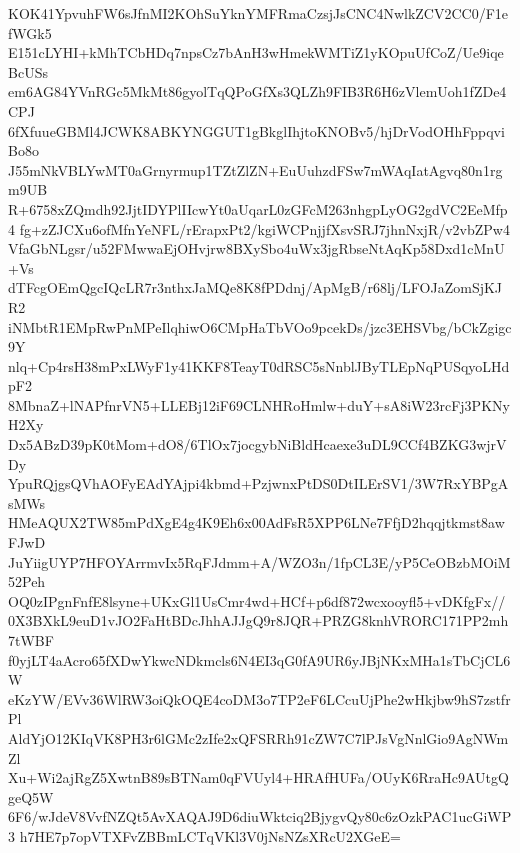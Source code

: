 KOK41YpvuhFW6sJfnMI2KOhSuYknYMFRmaCzsjJsCNC4NwlkZCV2CC0/F1efWGk5
E151cLYHI+kMhTCbHDq7npsCz7bAnH3wHmekWMTiZ1yKOpuUfCoZ/Ue9iqeBcUSs
em6AG84YVnRGc5MkMt86gyolTqQPoGfXs3QLZh9FIB3R6H6zVlemUoh1fZDe4CPJ
6fXfuueGBMl4JCWK8ABKYNGGUT1gBkglIhjtoKNOBv5/hjDrVodOHhFppqviBo8o
J55mNkVBLYwMT0aGrnyrmup1TZtZlZN+EuUuhzdFSw7mWAqIatAgvq80n1rgm9UB
R+6758xZQmdh92JjtIDYPlIIcwYt0aUqarL0zGFcM263nhgpLyOG2gdVC2EeMfp4
fg+zZJCXu6ofMfnYeNFL/rErapxPt2/kgiWCPnjjfXsvSRJ7jhnNxjR/v2vbZPw4
VfaGbNLgsr/u52FMwwaEjOHvjrw8BXySbo4uWx3jgRbseNtAqKp58Dxd1cMnU+Vs
dTFcgOEmQgcIQcLR7r3nthxJaMQe8K8fPDdnj/ApMgB/r68lj/LFOJaZomSjKJR2
iNMbtR1EMpRwPnMPeIlqhiwO6CMpHaTbVOo9pcekDs/jzc3EHSVbg/bCkZgigc9Y
nlq+Cp4rsH38mPxLWyF1y41KKF8TeayT0dRSC5sNnblJByTLEpNqPUSqyoLHdpF2
8MbnaZ+lNAPfnrVN5+LLEBj12iF69CLNHRoHmlw+duY+sA8iW23rcFj3PKNyH2Xy
Dx5ABzD39pK0tMom+dO8/6TlOx7jocgybNiBldHcaexe3uDL9CCf4BZKG3wjrVDy
YpuRQjgsQVhAOFyEAdYAjpi4kbmd+PzjwnxPtDS0DtILErSV1/3W7RxYBPgAsMWs
HMeAQUX2TW85mPdXgE4g4K9Eh6x00AdFsR5XPP6LNe7FfjD2hqqjtkmst8awFJwD
JuYiigUYP7HFOYArrmvIx5RqFJdmm+A/WZO3n/1fpCL3E/yP5CeOBzbMOiM52Peh
OQ0zIPgnFnfE8lsyne+UKxGl1UsCmr4wd+HCf+p6df872wcxooyfl5+vDKfgFx//
0X3BXkL9euD1vJO2FaHtBDcJhhAJJgQ9r8JQR+PRZG8knhVRORC171PP2mh7tWBF
f0yjLT4aAcro65fXDwYkwcNDkmcls6N4EI3qG0fA9UR6yJBjNKxMHa1sTbCjCL6W
eKzYW/EVv36WlRW3oiQkOQE4coDM3o7TP2eF6LCcuUjPhe2wHkjbw9hS7zstfrPl
AldYjO12KIqVK8PH3r6lGMc2zIfe2xQFSRRh91cZW7C7lPJsVgNnlGio9AgNWmZl
Xu+Wi2ajRgZ5XwtnB89sBTNam0qFVUyl4+HRAfHUFa/OUyK6RraHc9AUtgQgeQ5W
6F6/wJdeV8VvfNZQt5AvXAQAJ9D6diuWktciq2BjygvQy80c6zOzkPAC1ucGiWP3
h7HE7p7opVTXFvZBBmLCTqVKl3V0jNsNZsXRcU2XGeE=
